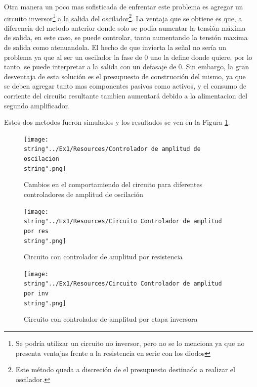 Otra manera un poco mas sofisticada de enfrentar este problema es
agregar un circuito inversor\footnote{Se podría utilizar un circuito no inversor, pero no se lo menciona
ya que no presenta ventajas frente a la resistencia en serie con los
diodos} a la salida del oscilador\footnote{Este método queda a discreción de el presupuesto destinado a realizar
el oscilador.}. La ventaja que se obtiene es que, a diferencia del metodo anterior
donde solo se podia aumentar la tensión máxima de salida, en este
caso, se puede controlar, tanto aumentando la tensión maxima de salida
como atenuandola. El hecho de que invierta la señal no sería un problema
ya que al ser un oscilador la fase de 0\textdegree{} uno la define
donde quiere, por lo tanto, se puede interpretar a la salida con un
defasaje de 0\textdegree . Sin embargo, la gran desventaja de esta
solución es el presupuesto de construcción del mismo, ya que se deben
agregar tanto mas componentes pasivos como activos, y el consumo de
corriente del circuito resultante tambien aumentará debido a la alimentacion
del segundo amplificador. 

Estos dos metodos fueron simulados y los resultados se ven en la Figura
\ref{1_7}.

\begin{figure}[H]
\begin{centering}
\texttt{[image: \\string"../Ex1/Resources/Controlador de amplitud de oscilacion\\string".png]}
\par\end{centering}
\caption{Cambios en el comportamiendo del circuito para diferentes controladores
de amplitud de oscilación}
\label{1_7}

\end{figure}

\begin{figure}[H]
\begin{centering}
\texttt{[image: \\string"../Ex1/Resources/Circuito Controlador de amplitud por res\\string".png]}
\par\end{centering}
\caption{Circuito con controlador de amplitud por resistencia}

\end{figure}

\begin{figure}[H]
\begin{centering}
\texttt{[image: \\string"../Ex1/Resources/Circuito Controlador de amplitud por inv\\string".png]}
\par\end{centering}
\caption{Circuito con controlador de amplitud por etapa inversora}

\end{figure}

